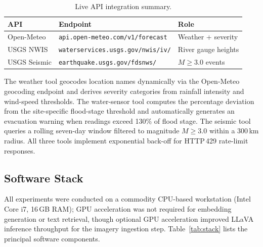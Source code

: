 \documentclass[conference]{IEEEtran}
\begin{document}
\begin{table}[ht]
\centering
\caption{Live API integration summary.}
\label{tab:apis}
\renewcommand{\arraystretch}{1.2}
\begin{tabular}{@{}lll@{}}
\toprule
\textbf{API} & \textbf{Endpoint} & \textbf{Role} \\ \midrule
Open-Meteo   & \texttt{api.open-meteo.com/v1/forecast}    & Weather + severity \\
USGS NWIS    & \texttt{waterservices.usgs.gov/nwis/iv/}   & River gauge heights \\
USGS Seismic & \texttt{earthquake.usgs.gov/fdsnws/}       & $M{\geq}3.0$ events \\ \bottomrule
\end{tabular}
\end{table}

The weather tool geocodes location names dynamically via the Open-Meteo
geocoding endpoint and derives severity categories from rainfall intensity and
wind-speed thresholds. The water-sensor tool computes the percentage deviation
from the site-specific flood-stage threshold and automatically generates an
evacuation warning when readings exceed 130\% of flood stage. The seismic tool
queries a rolling seven-day window filtered to magnitude $M{\geq}3.0$ within a
300\,km radius. All three tools implement exponential back-off for HTTP\,429
rate-limit responses.

\subsection{Software Stack}

All experiments were conducted on a commodity CPU-based workstation
(Intel Core i7, 16\,GB RAM); GPU acceleration was not required for embedding
generation or text retrieval, though optional GPU acceleration improved LLaVA
inference throughput for the imagery ingestion step.
Table~\ref{tab:stack} lists the principal software components.
\end{document}
